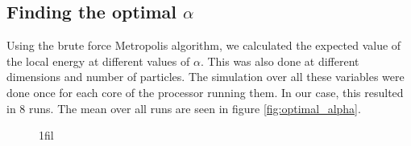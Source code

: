 \documentclass[
]{article}
\makeatletter
\newcommand*{\centerfloat}{%
  \parindent \z@
  \leftskip \z@ \@plus 1fil \@minus \textwidth
  \rightskip\leftskip
  \parfillskip \z@skip}
\makeatother
\begin{document}
\hypertarget{finding-the-optimal-alpha}{%
\subsection{\texorpdfstring{Finding the optimal
\(\alpha\)}{Finding the optimal \textbackslash alpha}}\label{finding-the-optimal-alpha}}

Using the brute force Metropolis algorithm, we calculated the expected
value of the local energy at different values of \(\alpha\). This was
also done at different dimensions and number of particles. The
simulation over all these variables were done once for each core of the
processor running them. In our case, this resulted in 8 runs. The mean
over all runs are seen in figure \ref{fig:optimal_alpha}.

\begin{figure}[ht]%
  \centerfloat
  \captionsetup[subfigure]{labelformat=empty}
  \\

\end{figure}
\end{document}
